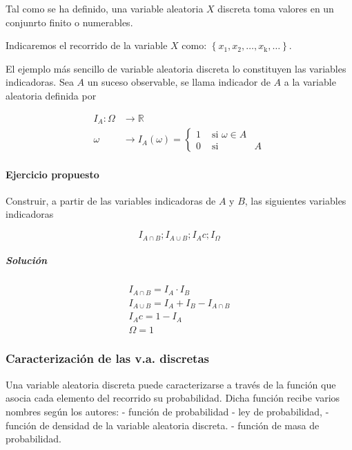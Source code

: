 \documentclass[
]{article}
\begin{document}
Tal como se ha definido, una variable aleatoria \(X\) discreta toma valores en un conjunrto finito o numerables.

Indicaremos el recorrido de la variable \(X\) como:
\(\left\{x_{1}, x_{2}, \ldots, x_{\mathrm{k}}, \ldots\right\}\).

El ejemplo más sencillo de variable aleatoria discreta lo constituyen
las variables indicadoras. Sea \(A\) un suceso observable, se llama
indicador de \(A\) a la variable aleatoria definida por

\[
\begin{aligned}
I_{A}: \Omega & \rightarrow \mathbb{R} \\
\omega & \rightarrow I_{A}(\omega)=\left\{\begin{array}{lll}
1 & \text { si } \omega \in A \\
0 & \text { si } & A
\end{array}\right.
\end{aligned}
\]

\paragraph{Ejercicio propuesto}\label{ejercicio-propuesto}

Construir, a partir de las variables indicadoras de \(A\) y \(B\), las
siguientes variables indicadoras

\[
I_{A \cap B} ; I_{A \cup B} ; I_{A} c ; I_{\Omega}
\]

\subparagraph{Solución}\label{soluciuxf3n}

\[
\begin{gathered}
I_{A \cap B}=I_{A} \cdot I_{B} \\
I_{A \cup B}=I_{A}+I_{B}-I_{A \cap B} \\
I_{A} c=1-I_{A} \\
\Omega=1
\end{gathered}
\]

\subsubsection{Caracterización de las v.a. discretas}\label{caracterizaciuxf3n-de-las-v.a.-discretas}

Una variable aleatoria discreta puede caracterizarse a través de la
función que asocia cada elemento del recorrido su probabilidad.
Dicha función recibe varios nombres según los autores:
- función de probabilidad
- ley de probabilidad,
- función de densidad de la variable aleatoria
discreta.
- función de masa de probabilidad.
\end{document}
